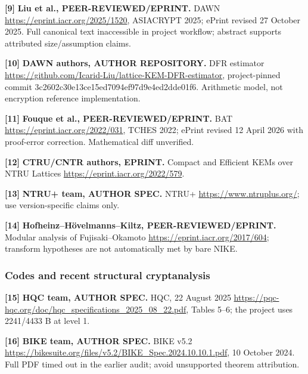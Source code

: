\documentclass[
  10pt,
  a4paper,
]{article}
\begin{document}
\hypertarget{ref9}{}

\textbf{{[}9{]}} \textbf{Liu et al., PEER-REVIEWED/EPRINT.} DAWN
\url{https://eprint.iacr.org/2025/1520}, ASIACRYPT 2025; ePrint revised
27 October 2025. Full canonical text inaccessible in project workflow;
abstract supports attributed size/assumption claims.

\hypertarget{ref10}{}

\textbf{{[}10{]}} \textbf{DAWN authors, AUTHOR REPOSITORY.} DFR
estimator \url{https://github.com/Icarid-Liu/lattice-KEM-DFR-estimator},
project-pinned commit 3c2602c30e13ce15ed7094ef97d9e4ed2dde01f6.
Arithmetic model, not encryption reference implementation.

\hypertarget{ref11}{}

\textbf{{[}11{]}} \textbf{Fouque et al., PEER-REVIEWED/EPRINT.} BAT
\url{https://eprint.iacr.org/2022/031}, TCHES 2022; ePrint revised 12
April 2026 with proof-error correction. Mathematical diff unverified.

\hypertarget{ref12}{}

\textbf{{[}12{]}} \textbf{CTRU/CNTR authors, EPRINT.} Compact and
Efficient KEMs over NTRU Lattices
\url{https://eprint.iacr.org/2022/579}.

\hypertarget{ref13}{}

\textbf{{[}13{]}} \textbf{NTRU+ team, AUTHOR SPEC.} NTRU+
\url{https://www.ntruplus.org/}; use version-specific claims only.

\hypertarget{ref14}{}

\textbf{{[}14{]}} \textbf{Hofheinz--Hövelmanns--Kiltz,
PEER-REVIEWED/EPRINT.} Modular analysis of Fujisaki--Okamoto
\url{https://eprint.iacr.org/2017/604}; transform hypotheses are not
automatically met by bare NIKE.

\hypertarget{codes-and-recent-structural-cryptanalysis}{%
\subsubsection{Codes and recent structural
cryptanalysis}\label{codes-and-recent-structural-cryptanalysis}}

\hypertarget{ref15}{}

\textbf{{[}15{]}} \textbf{HQC team, AUTHOR SPEC.} HQC, 22 August 2025
\url{https://pqc-hqc.org/doc/hqc_specifications_2025_08_22.pdf}, Tables
5--6; the project uses 2241/4433 B at level 1.

\hypertarget{ref16}{}

\textbf{{[}16{]}} \textbf{BIKE team, AUTHOR SPEC.} BIKE v5.2
\url{https://bikesuite.org/files/v5.2/BIKE_Spec.2024.10.10.1.pdf}, 10
October 2024. Full PDF timed out in the earlier audit; avoid unsupported
theorem attribution.
\end{document}
